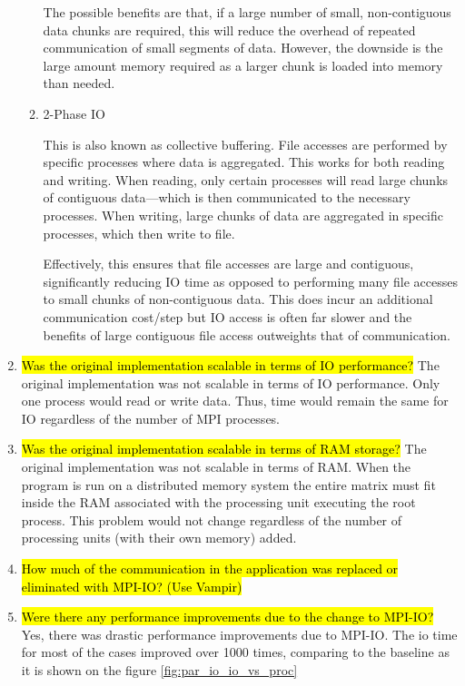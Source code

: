 \begin{enumerate}
\begin{enumerate}
	The possible benefits are that, if a large number of small, non-contiguous data chunks are required, this will reduce the overhead of repeated communication of small segments of data. However, the downside is the large amount memory required as a larger chunk is loaded into memory than needed.
	
	\item 2-Phase IO
	
	This is also known as collective buffering. File accesses are performed by specific processes where data is 
  aggregated. This works for both reading and writing. When reading, only certain processes will read large chunks of 
  contiguous data---which is then communicated to the necessary processes. When writing, large chunks of data are 
  aggregated in specific processes, which then write to file.
	
	Effectively, this ensures that file accesses are large and contiguous, significantly reducing IO time as opposed to performing many file accesses to small chunks of non-contiguous data. This does incur an additional communication cost/step but IO access is often far slower and the benefits of large contiguous file access outweights that of communication.
	\end{enumerate}

  \item \hl{Was the original implementation scalable in terms of IO performance?}
  The original implementation was not scalable in terms of IO performance. Only one process would read or write data. 
  Thus, time would remain the same for IO regardless of the number of MPI processes.
  
  \item \hl{Was the original implementation scalable in terms of RAM storage?}
  The original implementation was not scalable in terms of RAM. 
  When the program is run on a distributed memory system the entire matrix must fit inside the RAM associated with 
  the processing unit executing the root process. This problem would not change regardless of the number of 
  processing units (with their own memory) added.
  
  \item \hl{How much of the communication in the application was replaced or eliminated with MPI-IO? (Use
Vampir)}

  \item \hl{Were there any performance improvements due to the change to MPI-IO?}
  Yes, there was drastic performance improvements due to MPI-IO. The io time for most of the cases improved over 1000
  times, comparing to the baseline as it is shown on the figure \ref{fig:par_io_io_vs_proc}


\end{enumerate}
